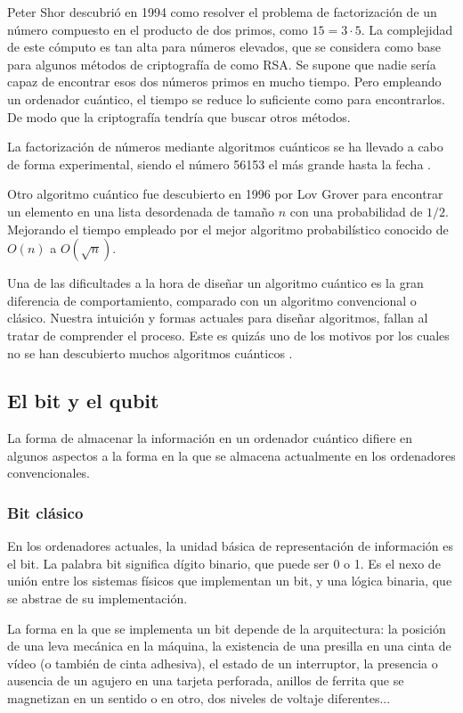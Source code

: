 Peter Shor descubrió en 1994 \cite{shor97} como resolver el problema de 
factorización de un número compuesto en el producto de dos primos, como $15 = 
3\cdot5$. La complejidad de este cómputo es tan alta para números elevados, que 
se considera como base para algunos métodos de criptografía de como RSA. Se 
supone que nadie sería capaz de encontrar esos dos números primos en mucho 
tiempo. Pero empleando un ordenador cuántico, el tiempo se reduce lo suficiente 
como para encontrarlos. De modo que la criptografía tendría que buscar otros 
métodos.

La factorización de números mediante algoritmos cuánticos se ha llevado a cabo 
de forma experimental, siendo el número 56153 el más grande hasta la fecha 
\cite{factor}. 

Otro algoritmo cuántico fue descubierto en 1996 por Lov Grover \cite{grover96} 
para encontrar un elemento en una lista desordenada de tamaño $n$ con una 
probabilidad de $1/2$.  Mejorando el tiempo empleado por el mejor algoritmo 
probabilístico conocido de $O(n)$ a $O(\sqrt{n})$.

Una de las dificultades a la hora de diseñar un algoritmo cuántico es la gran 
diferencia de comportamiento, comparado con un algoritmo convencional o clásico.  
Nuestra intuición y formas actuales para diseñar algoritmos, fallan al tratar de 
comprender el proceso. Este es quizás uno de los motivos por los cuales no se 
han descubierto muchos algoritmos cuánticos \cite{shor03}.

\subsection{El bit y el qubit}
La forma de almacenar la información en un ordenador cuántico difiere en algunos 
aspectos a la forma en la que se almacena actualmente en los ordenadores 
convencionales.

\subsubsection{Bit clásico}
En los ordenadores actuales, la unidad básica de representación de información 
es el bit. La palabra bit significa dígito binario, que puede ser 0 o 1. Es el 
nexo de unión entre los sistemas físicos que implementan un bit, y una lógica 
binaria, que se abstrae de su implementación.

La forma en la que se implementa un bit depende de la arquitectura: la posición 
de una leva mecánica en la máquina, la existencia de una presilla en una cinta 
de vídeo (o también de cinta adhesiva), el estado de un interruptor, la 
presencia o ausencia de un agujero en una tarjeta perforada, anillos de ferrita 
que se magnetizan en un sentido o en otro, dos niveles de voltaje diferentes...

